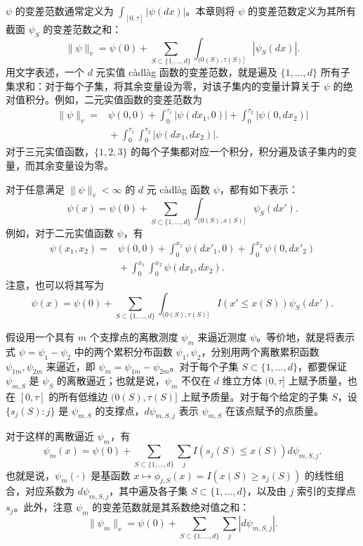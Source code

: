 $\psi$ 的变差范数通常定义为 $\int_{[0,\tau]}|\psi(dx)|$。本章则将 $\psi$ 的变差范数定义为其所有截面 $\psi_S$ 的变差范数之和：
\[
 \|\psi\|_v=\psi(0)+\sum_{S\subset\{1,\ldots,d\}}
       \int_{(0(S),\tau(S)]}|\psi_S(dx)|.
\]
用文字表述，一个 $d$ 元实值 càdlàg 函数的变差范数，就是遍及 $\{1,\ldots,d\}$ 所有子集求和：对于每个子集，将其余变量设为零，对该子集内的变量计算关于 $\psi$ 的绝对值积分。例如，二元实值函数的变差范数为
\[
 \begin{aligned}
 \|\psi\|_v={}&\psi(0,0)+\int_0^{\tau_1}|\psi(dx_1,0)|
                   +\int_0^{\tau_2}|\psi(0,dx_2)|\\
             &{}+\int_0^{\tau_1}\int_0^{\tau_2}|\psi(dx_1,dx_2)|.
 \end{aligned}
\]
对于三元实值函数，$\{1,2,3\}$ 的每个子集都对应一个积分，积分遍及该子集内的变量，而其余变量设为零。

对于任意满足 $\|\psi\|_v<\infty$ 的 $d$ 元 càdlàg 函数 $\psi$，都有如下表示：
\[
 \psi(x)=\psi(0)+\sum_{S\subset\{1,\ldots,d\}}
                 \int_{(0(S),x(S)]}\psi_S(dx').
\]
例如，对于二元实值函数 $\psi$，有
\[
 \begin{aligned}
 \psi(x_1,x_2)={}&\psi(0,0)+\int_0^{x_1}\psi(dx'_1,0)
                           +\int_0^{x_2}\psi(0,dx'_2)\\
                 &{}+\int_0^{x_1}\int_0^{x_2}\psi(dx_1,dx_2).
 \end{aligned}
\]
注意，也可以将其写为
\[
 \psi(x)=\psi(0)+\sum_{S\subset\{1,\ldots,d\}}
        \int_{(0(S),\tau(S)]}I(x'\leq x(S))\psi_S(dx').
\]

假设用一个具有 $m$ 个支撑点的离散测度 $\psi_m$ 来逼近测度 $\psi$。等价地，就是将表示式 $\psi=\psi_1-\psi_2$ 中的两个累积分布函数 $\psi_1,\psi_2$，分别用两个离散累积函数 $\psi_{1m},\psi_{2m}$ 来逼近，即 $\psi_m=\psi_{1m}-\psi_{2m}$。对于每个子集 $S\subset\{1,\ldots,d\}$，都要保证 $\psi_{m,S}$ 是 $\psi_S$ 的离散逼近；也就是说，$\psi_m$ 不仅在 $d$ 维立方体 $(0,\tau]$ 上赋予质量，也在 $[0,\tau]$ 的所有低维边 $(0(S),\tau(S)]$ 上赋予质量。对于每个给定的子集 $S$，设 $\{s_j(S):j\}$ 是 $\psi_{m,S}$ 的支撑点，$d\psi_{m,S,j}$ 表示 $\psi_{m,S}$ 在该点赋予的点质量。

对于这样的离散逼近 $\psi_m$，有
\[
 \psi_m(x)=\psi(0)+\sum_{S\subset\{1,\ldots,d\}}\sum_j
                 I(s_j(S)\leq x(S))d\psi_{m,S,j}.
\]
也就是说，$\psi_m(\cdot)$ 是基函数 $x\mapsto\phi_{j,S}(x)=I(x(S)\geq s_j(S))$ 的线性组合，对应系数为 $d\psi_{m,S,j}$，其中遍及各子集 $S\subset\{1,\ldots,d\}$，以及由 $j$ 索引的支撑点 $s_j$。此外，注意 $\psi_m$ 的变差范数就是其系数绝对值之和：
\[
 \|\psi_m\|_v=\psi(0)+\sum_{S\subset\{1,\ldots,d\}}\sum_j|d\psi_{m,S,j}|.
\]

